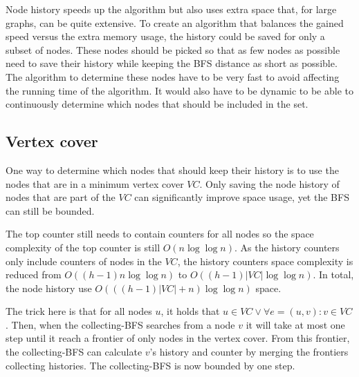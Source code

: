 Node history speeds up the algorithm but also uses extra space that, for large graphs, can be quite extensive. To create an algorithm that balances the gained speed versus the extra memory usage, the history could be saved for only a subset of nodes. These nodes should be picked so that as few nodes as possible need to save their history while keeping the BFS distance as short as possible. The algorithm to determine these nodes have to be very fast to avoid affecting the running time of the algorithm. It would also have to be dynamic to be able to continuously determine which nodes that should be included in the set.

\subsection{Vertex cover}
One way to determine which nodes that should keep their history is to use the nodes that are in a minimum vertex cover $VC$. Only saving the node history of nodes that are part of the $VC$ can significantly improve space usage, yet the BFS can still be bounded. 

The top counter still needs to contain counters for all nodes so the space complexity of the top counter is still $O(n\log \log n)$. As the history counters only include counters of nodes in the $VC$, the history counters space complexity is reduced from $O((h-1)n \log \log n)$ to $O((h-1)|VC| \log \log n)$. In total, the node history use $O(((h-1)|VC| + n )\log \log n)$ space.

The trick here is that for all nodes $u$, it holds that $u \in VC \vee \forall e = (u,v) : v \in VC$. Then, when the collecting-BFS searches from a node $v$ it will take at most one step until it reach a frontier of only nodes in the vertex cover. From this frontier, the collecting-BFS can calculate $v$'s history and counter by merging the frontiers collecting histories. The collecting-BFS is now bounded by one step.\\

